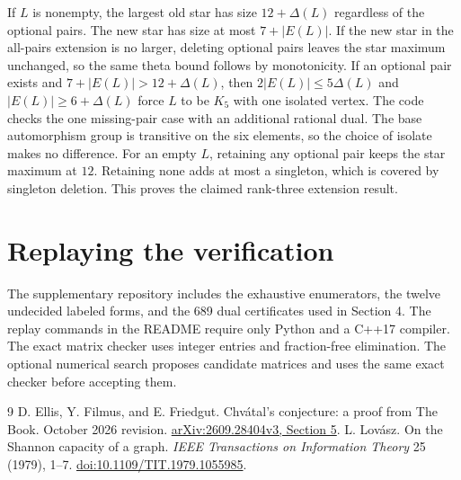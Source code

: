 \documentclass[10pt]{article}
\begin{document}
If $L$ is nonempty, the largest old star has size $12+\Delta(L)$ regardless
of the optional pairs. The new star has size at most $7+|E(L)|$. If the
new star in the all-pairs extension is no larger, deleting optional pairs
leaves the star maximum unchanged, so the same theta bound follows by
monotonicity. If an optional pair exists and $7+|E(L)|>12+\Delta(L)$, then
$2|E(L)|\leq5\Delta(L)$ and $|E(L)|\geq6+\Delta(L)$ force $L$ to be $K_5$
with one isolated vertex. The code checks the one missing-pair case with
an additional rational dual. The base automorphism group is transitive on
the six elements, so the choice of isolate makes no difference. For an
empty $L$, retaining any optional pair keeps the star maximum at $12$.
Retaining none adds at most a singleton, which is covered by singleton
deletion. This proves the claimed rank-three extension result.

\section{Replaying the verification}
The supplementary repository includes the exhaustive enumerators, the
twelve undecided labeled forms, and the 689 dual certificates used in
Section 4. The replay commands in the README require only Python and a
C++17 compiler. The exact matrix checker uses integer entries and
fraction-free elimination. The optional numerical search proposes
candidate matrices and uses the same exact checker before accepting them.

\begin{thebibliography}{9}
 D. Ellis, Y. Filmus, and E. Friedgut.
Chv\'atal's conjecture: a proof from The Book. October 2026 revision.
\href{https://arxiv.org/html/2609.28404v3\#S5}{arXiv:2609.28404v3, Section 5}.
 L. Lov\'asz. On the Shannon capacity of a graph.
\emph{IEEE Transactions on Information Theory} 25 (1979), 1--7.
\href{https://doi.org/10.1109/TIT.1979.1055985}{doi:10.1109/TIT.1979.1055985}.
\end{thebibliography}
\end{document}
